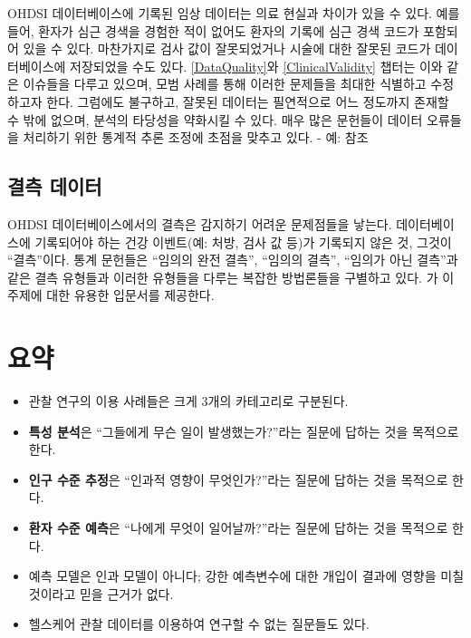 \documentclass[11pt]{book}
\theoremstyle{definition}
\theoremstyle{definition}
\theoremstyle{definition}
\theoremstyle{remark}
\let\BeginKnitrBlock\begin \let\EndKnitrBlock\end
\begin{document}
OHDSI 데이터베이스에 기록된 임상 데이터는 의료 현실과 차이가 있을 수
있다. 예를 들어, 환자가 심근 경색을 경험한 적이 없어도 환자의 기록에
심근 경색 코드가 포함되어 있을 수 있다. 마찬가지로 검사 값이
잘못되었거나 시술에 대한 잘못된 코드가 데이터베이스에 저장되었을 수도
있다. \ref{DataQuality}와 \ref{ClinicalValidity} 챕터는 이와 같은
이슈들을 다루고 있으며, 모범 사례를 통해 이러한 문제들을 최대한 식별하고
수정하고자 한다. 그럼에도 불구하고, 잘못된 데이터는 필연적으로 어느
정도까지 존재할 수 밖에 없으며, 분석의 타당성을 약화시킬 수 있다. 매우
많은 문헌들이 데이터 오류들을 처리하기 위한 통계적 추론 조정에 초점을
맞추고 있다. - 예: \citet{fuller2009measurement} 참조

\subsection{결측 데이터}\label{-}


OHDSI 데이터베이스에서의 결측은 감지하기 어려운 문제점들을 낳는다.
데이터베이스에 기록되어야 하는 건강 이벤트(예: 처방, 검사 값 등)가
기록되지 않은 것, 그것이 ``결측''이다. 통계 문헌들은 ``임의의 완전
결측'', ``임의의 결측'', ``임의가 아닌 결측''과 같은 결측 유형들과
이러한 유형들을 다루는 복잡한 방법론들을 구별하고 있다.
\citet{perkins2017principled} 가 이 주제에 대한 유용한 입문서를
제공한다.

\section{요약}\label{-2}

\BeginKnitrBlock{rmdsummary}
\begin{itemize}
\item
  관찰 연구의 이용 사례들은 크게 3개의 카테고리로 구분된다.
\item
  \textbf{특성 분석}은 ``그들에게 무슨 일이 발생했는가?''라는 질문에
  답하는 것을 목적으로 한다.
\item
  \textbf{인구 수준 추정}은 ``인과적 영향이 무엇인가?''라는 질문에
  답하는 것을 목적으로 한다.
\item
  \textbf{환자 수준 예측}은 ``나에게 무엇이 일어날까?''라는 질문에
  답하는 것을 목적으로 한다.
\item
  예측 모델은 인과 모델이 아니다; 강한 예측변수에 대한 개입이 결과에
  영향을 미칠 것이라고 믿을 근거가 없다.
\item
  헬스케어 관찰 데이터를 이용하여 연구할 수 없는 질문들도 있다.
\end{itemize}
\EndKnitrBlock{rmdsummary}
\end{document}
